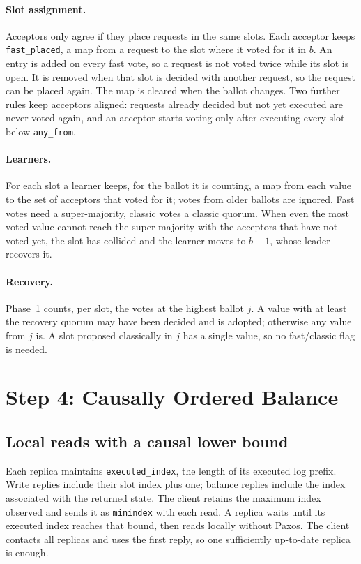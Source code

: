 \documentclass[times,10pt,twocolumn]{article}
\newcommand{\code}[1]{\texttt{\small #1}}
\begin{document}
\paragraph{Slot assignment.} Acceptors only agree if they place requests
in the same slots. Each acceptor keeps \code{fast\_placed}, a map from a
request to the slot where it voted for it in $b$. An entry is added on
every fast vote, so a request is not voted twice while its slot is open.
It is removed when that slot is decided with another request, so the
request can be placed again. The map is cleared when the ballot changes.
Two further rules keep acceptors aligned: requests already decided but
not yet executed are never voted again, and an acceptor starts voting
only after executing every slot below \code{any\_from}.

\paragraph{Learners.} For each slot a learner keeps, for the ballot it
is counting, a map from each value to the set of acceptors that voted
for it; votes from older ballots are ignored. Fast votes need a
super-majority, classic votes a classic quorum. When even the most voted
value cannot reach the super-majority with the acceptors that have not
voted yet, the slot has collided and the learner moves to $b+1$, whose
leader recovers it.

\paragraph{Recovery.} Phase~1 counts, per slot, the votes at the highest
ballot $j$. A value with at least the recovery quorum may have been
decided and is adopted; otherwise any value from $j$ is. A slot proposed
classically in $j$ has a single value, so no fast/classic flag is needed.

\section{Step 4: Causally Ordered Balance}
\label{sec:step4}

\subsection{Local reads with a causal lower bound}
Each replica maintains \code{executed\_index}, the length of its executed log
prefix. Write replies include their slot index plus one; balance replies
include the index associated with the returned state. The client retains
the maximum index observed and sends it as \code{minindex} with each read.
A replica waits until its executed index reaches that bound, then reads
locally without Paxos. The client contacts all replicas and uses the first
reply, so one sufficiently up-to-date replica is enough.
\end{document}
